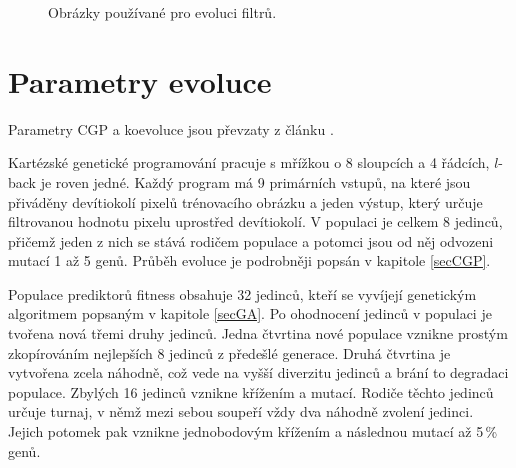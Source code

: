\begin{figure}[htb]
    \centering
    \hskip1.5cm
    \caption{Obrázky používané pro evoluci filtrů.}
    \label{obrTrenovaci}
\end{figure}

\section{Parametry evoluce}

Parametry CGP a koevoluce jsou převzaty z článku \cite{SikuPPSN}.

Kartézské genetické programování pracuje s mřížkou o 8 sloupcích a 4 řádcích, $l$-back je roven jedné. Každý program má 9 primárních vstupů, na které jsou přiváděny devítiokolí pixelů trénovacího obrázku a jeden výstup, který určuje filtrovanou hodnotu pixelu uprostřed devítiokolí. V populaci je celkem 8 jedinců, přičemž jeden z nich se stává rodičem populace a potomci jsou od něj odvozeni mutací 1 až 5 genů. Průběh evoluce je podrobněji popsán v kapitole \ref{secCGP}.

Populace prediktorů fitness obsahuje 32 jedinců, kteří se vyvíjejí genetickým algoritmem popsaným v kapitole \ref{secGA}. Po ohodnocení jedinců v populaci je tvořena nová třemi druhy jedinců. Jedna čtvrtina nové populace vznikne prostým zkopírováním nejlepších 8 jedinců z předešlé generace. Druhá čtvrtina je vytvořena zcela náhodně, což vede na vyšší diverzitu jedinců a brání to degradaci populace. Zbylých 16 jedinců vznikne křížením a mutací. Rodiče těchto jedinců určuje turnaj, v němž mezi sebou soupeří vždy dva náhodně zvolení jedinci. Jejich potomek pak vznikne jednobodovým křížením a následnou mutací až 5\,\% genů.

